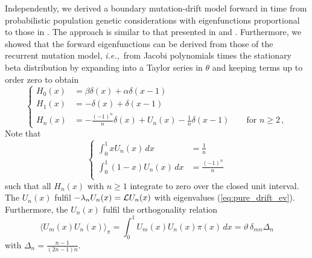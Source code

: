 \documentclass[preprint]{elsarticle}
\newcommand\ie{{\it i.e.,}}
\begin{document}
Independently, we derived a boundary mutation-drift model forward in time from probabilistic population genetic considerations \citep{Vogl15}  with eigenfunctions proportional to those in \citet{Tran14a}. The approach is similar to that presented in \citet{McKa07} and \citet{Waxm11}. Furthermore, we showed that the forward eigenfunctions can be derived from those of the recurrent mutation model, \ie\ from Jacobi polynomials times the stationary beta distribution by expanding into a Taylor series in $\theta$ and keeping terms up to order zero \citep[][Appendix A.1]{Vogl15} to obtain
\begin{equation}\label{eq:forw_Us}
\begin{cases}
    H_0(x)&=\beta\delta(x)+\alpha\delta(x-1)\\
    H_1(x)&=-\delta(x)+\delta(x-1)\\
    H_n(x)&=-\frac{(-1)^n}n\delta(x)+U_n(x)-\frac{1}n\delta(x-1)\qquad\text{for $n\geq 2$}\,,
\end{cases}
\end{equation}
Note that 
\begin{equation}\label{eq:int_U_n}
\begin{cases}
    \int_0^1 xU_n(x)\,dx&= \frac{1}n\\
    \int_0^1 (1-x)U_n(x)\,dx&= \frac{(-1)^n}n\\
\end{cases} 
\end{equation}
such that all $H_n(x)$ with $n\geq 1$ integrate to zero over the closed unit interval. The $U_n(x)$ fulfil $-\lambda_n U_n(x)={\cal L}U_n(x)$ with eigenvalues (\ref{eq:pure_drift_ev}). Furthermore, the $U_n(x)$ fulfil the orthogonality relation
\begin{equation}
    \langle U_m(x) U_n(x) \rangle_{\pi}=\int_0^1 U_m(x) U_n(x) \pi(x)\,dx=\vartheta\, \delta_{mn} \Delta_n
\end{equation}
with $\Delta_n=\frac{n-1}{(2n-1)n}$.
\end{document}
